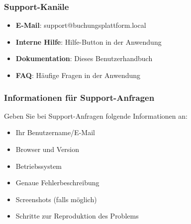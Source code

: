 \subsubsection{Support-Kanäle}

\begin{itemize}
    \item \textbf{E-Mail}: support@buchungsplattform.local
    \item \textbf{Interne Hilfe}: Hilfe-Button in der Anwendung
    \item \textbf{Dokumentation}: Dieses Benutzerhandbuch
    \item \textbf{FAQ}: Häufige Fragen in der Anwendung
\end{itemize}

\subsubsection{Informationen für Support-Anfragen}

Geben Sie bei Support-Anfragen folgende Informationen an:

\begin{itemize}
    \item Ihr Benutzername/E-Mail
    \item Browser und Version
    \item Betriebssystem
    \item Genaue Fehlerbeschreibung
    \item Screenshots (falls möglich)
    \item Schritte zur Reproduktion des Problems
\end{itemize}

\newpage